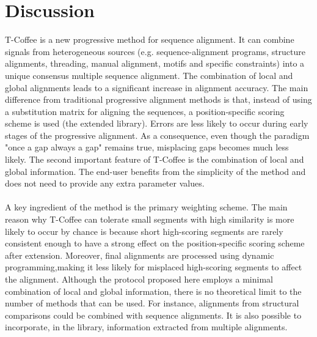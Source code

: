 \section{Discussion}
T-Coffee is a new progressive method for sequence alignment. It can combine signals from heterogeneous sources (e.g. sequence-alignment programs, structure alignments, threading, manual alignment, motifs and specific constraints) into a unique consensus multiple sequence alignment. 
The combination of local and global alignments leads to a significant increase in alignment accuracy. 
The main difference from traditional progressive alignment methods is that, instead of using a substitution matrix for aligning the sequences, a position-specific scoring scheme is used (the extended library). Errors are less likely to occur during early stages of the progressive alignment. As a consequence, even though the paradigm "once a gap always a gap" remains true, misplacing gaps becomes much less likely.
The second important feature of T-Coffee is the combination of local and global information. The end-user benefits from the simplicity of the method and does not need to provide any extra parameter values.
\\
\\
\noindent
A key ingredient of the method is the primary weighting scheme.  The main reason why T-Coffee can tolerate small segments with high similarity is more likely to occur by chance is because short high-scoring segments are rarely consistent enough to have a strong effect on the position-specific scoring scheme after extension. 
Moreover, final alignments are processed using dynamic programming,making it less likely for misplaced high-scoring segments to affect the alignment. 
Although the protocol proposed here employs a minimal combination of local and global information, there is no theoretical limit to the number of methods that can be used. For instance, alignments from structural comparisons could be combined with sequence alignments. It is also possible to incorporate, in the library, information extracted from multiple alignments.
